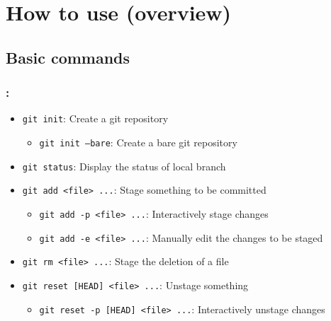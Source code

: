 \section{How to use (overview)}

\subsection{Basic commands}


\begin{frame}
    \frametitle{\secname: \small\subsecname\normalsize}

    \begin{itemize}
        \item \texttt{git init}: Create a git repository
        \begin{itemize}
            \item \texttt{git init --bare}: Create a bare git repository
        \end{itemize}
        \item \texttt{git status}: Display the status of local branch
        \item \texttt{git add <file> ...}: Stage something to be committed
        \begin{itemize}
            \item \texttt{git add -p <file> ...}: Interactively stage changes
            \item \texttt{git add -e <file> ...}: Manually edit the changes to be staged
        \end{itemize}
        \item \texttt{git rm <file> ...}: Stage the deletion of a file
        \item \texttt{git reset [HEAD] <file> ...}: Unstage something
        \begin{itemize}
            \item \texttt{git reset -p [HEAD] <file> ...}: Interactively unstage changes
        \end{itemize}
    \end{itemize}
\end{frame}

